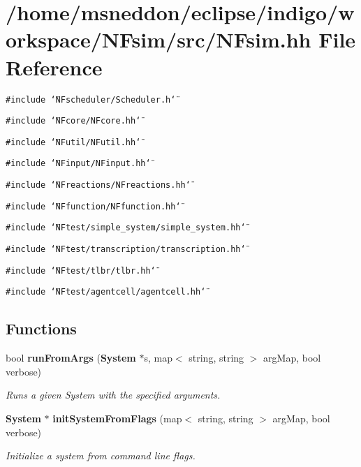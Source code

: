 \section{/home/msneddon/eclipse/indigo/workspace/NFsim/src/NFsim.hh File Reference}
\label{NFsim_8hh}


{\tt \#include \char`\"{}NFscheduler/Scheduler.h\char`\"{}}\par
{\tt \#include \char`\"{}NFcore/NFcore.hh\char`\"{}}\par
{\tt \#include \char`\"{}NFutil/NFutil.hh\char`\"{}}\par
{\tt \#include \char`\"{}NFinput/NFinput.hh\char`\"{}}\par
{\tt \#include \char`\"{}NFreactions/NFreactions.hh\char`\"{}}\par
{\tt \#include \char`\"{}NFfunction/NFfunction.hh\char`\"{}}\par
{\tt \#include \char`\"{}NFtest/simple\_\-system/simple\_\-system.hh\char`\"{}}\par
{\tt \#include \char`\"{}NFtest/transcription/transcription.hh\char`\"{}}\par
{\tt \#include \char`\"{}NFtest/tlbr/tlbr.hh\char`\"{}}\par
{\tt \#include \char`\"{}NFtest/agentcell/agentcell.hh\char`\"{}}\par
\subsection*{Functions}
\begin{CompactItemize}
\item 
bool {\bf runFromArgs} ({\bf System} $\ast$s, map$<$ string, string $>$ argMap, bool verbose)
\begin{CompactList}\small\item\em Runs a given System with the specified arguments. \item\end{CompactList}\item 
{\bf System} $\ast$ {\bf initSystemFromFlags} (map$<$ string, string $>$ argMap, bool verbose)
\begin{CompactList}\small\item\em Initialize a system from command line flags. \item\end{CompactList}\end{CompactItemize}


